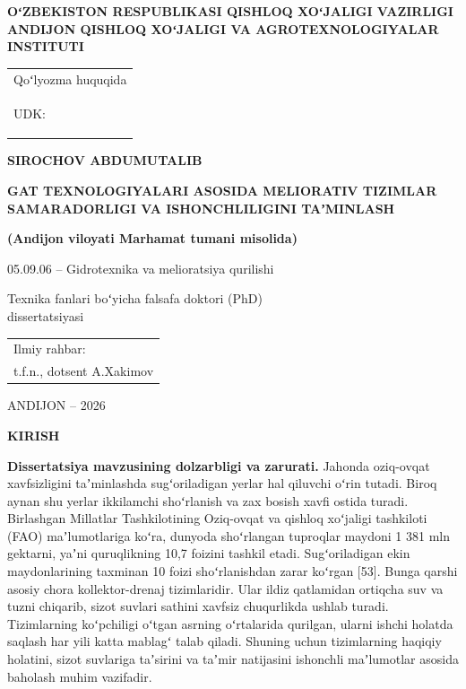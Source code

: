 \documentclass[14pt,a4paper,oneside]{extreport}
\newcommand{\oakbob}[1]{\clearpage\phantomsection\addcontentsline{toc}{chapter}{#1}%
  \begin{center}\bfseries\MakeUppercase{#1}\end{center}\vspace{6pt}}
\newcommand{\toldir}[1]{\colorbox{yellow}{\strut #1}}
\begin{document}
\begin{titlepage}\centering
{\bfseries OʻZBEKISTON RESPUBLIKASI QISHLOQ XOʻJALIGI VAZIRLIGI\\[4pt] ANDIJON QISHLOQ XOʻJALIGI VA AGROTEXNOLOGIYALAR INSTITUTI\par}
\vspace{20mm}
\hfill\begin{tabular}{l}Qoʻlyozma huquqida\\ UDK: \toldir{\hspace{25mm}}\end{tabular}
\vspace{25mm}

{\bfseries SIROCHOV ABDUMUTALIB\par}
\vspace{12mm}
{\bfseries\fontsize{16}{20}\selectfont GAT TEXNOLOGIYALARI ASOSIDA MELIORATIV TIZIMLAR SAMARADORLIGI VA ISHONCHLILIGINI TAʼMINLASH\par}
\vspace{4mm}
{\bfseries (Andijon viloyati Marhamat tumani misolida)\par}
\vspace{14mm}
05.09.06 – Gidrotexnika va melioratsiya qurilishi\par
\vspace{10mm}
Texnika fanlari boʻyicha falsafa doktori (PhD)\\ dissertatsiyasi\par
\vfill
\hfill\begin{tabular}{l}Ilmiy rahbar:\\ t.f.n., dotsent A.Xakimov\end{tabular}
\vfill
ANDIJON – 2026
\end{titlepage}
\setcounter{page}{2}
\tableofcontents
\oakbob{KIRISH}

\textbf{Dissertatsiya mavzusining dolzarbligi va zarurati.} Jahonda
oziq-ovqat xavfsizligini taʼminlashda sugʻoriladigan yerlar hal qiluvchi
oʻrin tutadi. Biroq aynan shu yerlar ikkilamchi shoʻrlanish va zax
bosish xavfi ostida turadi. Birlashgan Millatlar Tashkilotining
Oziq-ovqat va qishloq xoʻjaligi tashkiloti (FAO) maʼlumotlariga koʻra,
dunyoda shoʻrlangan tuproqlar maydoni 1 381 mln gektarni, yaʼni
quruqlikning 10,7 foizini tashkil etadi. Sugʻoriladigan ekin
maydonlarining taxminan 10 foizi shoʻrlanishdan zarar koʻrgan {[}53{]}.
Bunga qarshi asosiy chora kollektor-drenaj tizimlaridir. Ular ildiz
qatlamidan ortiqcha suv va tuzni chiqarib, sizot suvlari sathini xavfsiz
chuqurlikda ushlab turadi. Tizimlarning koʻpchiligi oʻtgan asrning
oʻrtalarida qurilgan, ularni ishchi holatda saqlash har yili katta
mablagʻ talab qiladi. Shuning uchun tizimlarning haqiqiy holatini, sizot
suvlariga taʼsirini va taʼmir natijasini ishonchli maʼlumotlar asosida
baholash muhim vazifadir.
\end{document}

